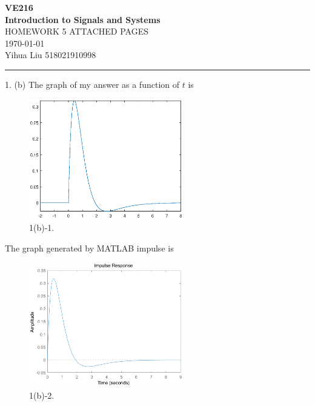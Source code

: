 \documentclass[a4paper]{article}
\begin{document}
\begin{center}
\huge
\textbf{VE216\\Introduction to Signals and Systems\\}
\Large
\vspace{30pt}
\uppercase{Homework 5 Attached Pages}\\
\vspace{5pt}\today\\
\vspace{5pt}
Yihua Liu 518021910998
\vspace{5pt}
\rule[-10pt]{.97\linewidth}{0.05em}
\end{center}

1. (b) The graph of my answer as a function of $t$ is
\begin{figure}[H]
    \begin{center}
        \includegraphics[width=0.6\textwidth]{1(b)-1.eps}
    \end{center}
    \caption{1(b)-1.}
\end{figure}

The graph generated by MATLAB \textsf{impulse} is
\begin{figure}[H]
    \begin{center}
        \includegraphics[width=0.6\textwidth]{1(b)-2.eps}
    \end{center}
    \caption{1(b)-2.}
\end{figure}
\end{document}
